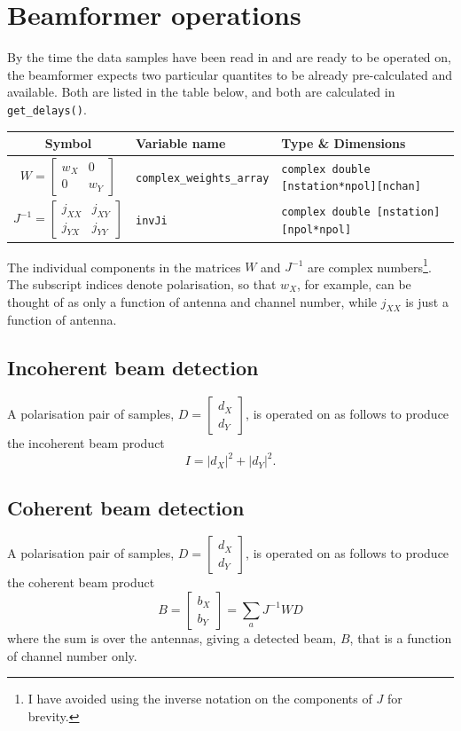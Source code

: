 \documentclass{article}
\begin{document}
\section{Beamformer operations}

By the time the data samples have been read in and are ready to be operated on, the beamformer expects two particular quantites to be already pre-calculated and available.
Both are listed in the table below, and both are calculated in \texttt{get\_delays()}.
\begin{table}[!h]
    \centering
    \begin{tabular}{c|l|l}
        Symbol & Variable name & Type \& Dimensions \\[5pt]
        \hline
        $W = \begin{bmatrix} w_X & 0 \\ 0 & w_Y \end{bmatrix}$ & \texttt{complex\_weights\_array} & \texttt{complex double [nstation*npol][nchan]} \\[12pt]
        $J^{-1} = \begin{bmatrix} j_{XX} & j_{XY} \\ j_{YX} & j_{YY} \end{bmatrix}$ & \texttt{invJi} & \texttt{complex double [nstation][npol*npol]}
    \end{tabular}
\end{table}
The individual components in the matrices $W$ and $J^{-1}$ are complex numbers\footnote{I have avoided using the inverse notation on the components of $J$ for brevity.}. The subscript indices denote polarisation, so that $w_X$, for example, can be thought of as only a function of antenna and channel number, while $j_{XX}$ is just a function of antenna.

\subsection{Incoherent beam detection}
A polarisation pair of samples, $D = \begin{bmatrix} d_X \\ d_Y \end{bmatrix}$, is operated on as follows to produce the incoherent beam product
\begin{equation}
    I = |d_X|^2 + |d_Y|^2.
\end{equation}

\subsection{Coherent beam detection}
A polarisation pair of samples, $D = \begin{bmatrix} d_X \\ d_Y \end{bmatrix}$, is operated on as follows to produce the coherent beam product
\begin{equation}
    B = \begin{bmatrix} b_X \\ b_Y \end{bmatrix} = \sum_a J^{-1}WD
\end{equation}
where the sum is over the antennas, giving a detected beam, $B$, that is a function of channel number only.
\end{document}
